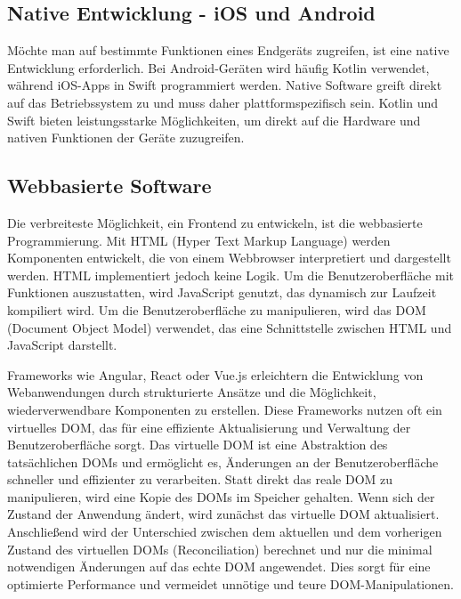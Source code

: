 \vspace{0.5cm}

\subsection{Native Entwicklung - iOS und Android}

Möchte man auf bestimmte Funktionen eines Endgeräts zugreifen, ist eine native Entwicklung erforderlich. Bei Android-Geräten wird häufig Kotlin verwendet, während iOS-Apps in Swift programmiert werden. Native Software greift direkt auf das Betriebssystem zu und muss daher plattformspezifisch sein. Kotlin und Swift bieten leistungsstarke Möglichkeiten, um direkt auf die Hardware und nativen Funktionen der Geräte zuzugreifen.

\vspace{0.5cm}

\subsection{Webbasierte Software}

Die verbreiteste Möglichkeit, ein Frontend zu entwickeln, ist die webbasierte Programmierung. Mit HTML (Hyper Text Markup Language) werden Komponenten entwickelt, die von einem Webbrowser interpretiert und dargestellt werden. HTML implementiert jedoch keine Logik. Um die Benutzeroberfläche mit Funktionen auszustatten, wird JavaScript genutzt, das dynamisch zur Laufzeit kompiliert wird. Um die Benutzeroberfläche zu manipulieren, wird das DOM (Document Object Model) verwendet, das eine Schnittstelle zwischen HTML und JavaScript darstellt.

\vspace{0.5cm}

Frameworks wie Angular, React oder Vue.js erleichtern die Entwicklung von Webanwendungen durch strukturierte Ansätze und die Möglichkeit, wiederverwendbare Komponenten zu erstellen. Diese Frameworks nutzen oft ein virtuelles DOM, das für eine effiziente Aktualisierung und Verwaltung der Benutzeroberfläche sorgt. Das virtuelle DOM ist eine Abstraktion des tatsächlichen DOMs und ermöglicht es, Änderungen an der Benutzeroberfläche schneller und effizienter zu verarbeiten. Statt direkt das reale DOM zu manipulieren, wird eine Kopie des DOMs im Speicher gehalten. Wenn sich der Zustand der Anwendung ändert, wird zunächst das virtuelle DOM aktualisiert. Anschließend wird der Unterschied zwischen dem aktuellen und dem vorherigen Zustand des virtuellen DOMs (Reconciliation) berechnet und nur die minimal notwendigen Änderungen auf das echte DOM angewendet. Dies sorgt für eine optimierte Performance und vermeidet unnötige und teure DOM-Manipulationen.

